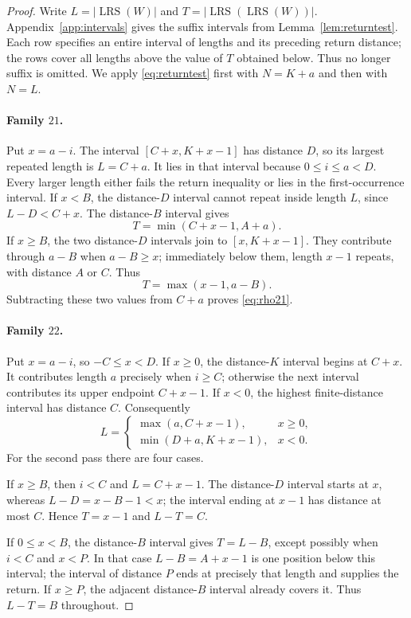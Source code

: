 \documentclass[11pt]{amsart}
\newcommand{\LRS}{\operatorname{LRS}}
\begin{document}
\begin{proof}
Write $L=|\LRS(W)|$ and $T=|\LRS(\LRS(W))|$.
Appendix~\ref{app:intervals} gives the suffix intervals from
Lemma~\ref{lem:returntest}.  Each row specifies an entire interval of
lengths and its preceding return distance; the rows cover all lengths
above the value of $T$ obtained below.  Thus no longer suffix is omitted.
We apply \eqref{eq:returntest} first with $N=K+a$ and then with $N=L$.

\paragraph{Family $21$.}
Put $x=a-i$.  The interval $[C+x,K+x-1]$ has distance $D$, so its
largest repeated length is $L=C+a$.  It lies in that interval because
$0\le i\le a<D$.  Every larger length either fails the return inequality
or lies in the first-occurrence interval.
If $x<B$, the distance-$D$ interval cannot repeat inside length $L$,
since $L-D<C+x$.  The distance-$B$ interval gives
\[
 T=\min(C+x-1,A+a).
\]
If $x\ge B$, the two distance-$D$ intervals join to $[x,K+x-1]$.
They contribute through $a-B$ when $a-B\ge x$; immediately below them,
length $x-1$ repeats, with distance $A$ or $C$.  Thus
\[
 T=\max(x-1,a-B).
\]
Subtracting these two values from $C+a$ proves \eqref{eq:rho21}.

\paragraph{Family $22$.}
Put $x=a-i$, so $-C\le x<D$.  If $x\ge0$, the distance-$K$ interval
begins at $C+x$.  It contributes length $a$ precisely when $i\ge C$;
otherwise the next interval contributes its upper endpoint $C+x-1$.
If $x<0$, the highest finite-distance interval has distance $C$.
Consequently
\begin{equation}\label{eq:L22}
 L=\begin{cases}
 \max(a,C+x-1),&x\ge0,\\
 \min(D+a,K+x-1),&x<0.
 \end{cases}
\end{equation}
For the second pass there are four cases.

If $x\ge B$, then $i<C$ and $L=C+x-1$.  The distance-$D$ interval
starts at $x$, whereas $L-D=x-B-1<x$; the interval ending at $x-1$
has distance at most $C$.  Hence $T=x-1$ and $L-T=C$.

If $0\le x<B$, the distance-$B$ interval gives $T=L-B$, except possibly
when $i<C$ and $x<P$.  In that case $L-B=A+x-1$ is one position below
this interval; the interval of distance $P$ ends at precisely that
length and supplies the return.  If $x\ge P$, the adjacent
 distance-$B$ interval already covers it.  Thus $L-T=B$ throughout.


\end{proof}
\end{document}
